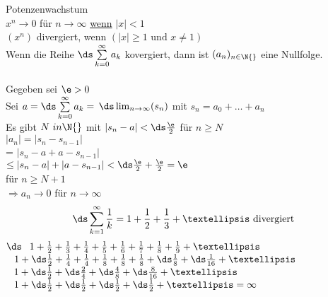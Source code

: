 Potenzenwachstum\\
$x^n \to 0$ für $ n \to \infty$ \underline{wenn} $|x| < 1$\\
$(x^n)$ divergiert, wenn $(|x| \geq 1 \text{ und } x \neq 1)$\\
%
Wenn die Reihe $\ds\sum\limits_{k=0}^{\infty} a_k $ kovergiert, dann ist $(a_n)_{n \in \N{}}$ eine Nullfolge.\\
\\
\bew Gegeben sei $\e > 0$\\
Sei $a = \ds\sum\limits_{k = 0}^{\infty} a_k = $ $\ds\lim_{n \to \infty}(s_n)$ mit $s_n = a_0 + … + a_n$\\
Es gibt $ N \ in \N{}$ mit $|s_n - a| < \ds\frac{\e}{2}$ für $n \geq N$\\
$|a_n| = |s_n - s_{n-1}|$\\
\phantom{$|a_n| $} = $|s_n - a + a - s_{n-1}|$\\
\phantom{$|a_n| $} $\leq |s_n - a| + |a - s_{n-1}| < \ds\frac{\e}{2} + \frac{\e}{2} = \e$\\
für $n \geq N + 1$\\
$\Rightarrow a_n \to 0$ für $n \to \infty$\\
%
$$\ds\sum\limits_{k = 1}^{\infty} \frac{1}{k}= 1 + \frac{1}{2} + \frac{1}{3} + …\text{ divergiert}$$
$\ds\phantom{= }1 + \frac{1}{2} + \frac{1}{3} +\frac{1}{4} +\frac{1}{5} +\frac{1}{6} +\frac{1}{7} + \frac{1}{8} +\frac{1}{9} +…$\\
$\phantom{\geq }1 + \ds\frac{1}{2} +\frac{1}{4}+\frac{1}{4}+\frac{1}{8}+\frac{1}{8} + \frac{1}{8} + \ds\frac{1}{8} + \ds\frac{1}{16} + …$\\
$\phantom{= }1 + \ds\frac{1}{2} + \ds\frac{2}{4} + \ds\frac{4}{8} + \ds\frac{8}{16} + …$\\
$\phantom{= }1 + \ds\frac{1}{2} + \ds\frac{1}{2} + \ds\frac{1}{2} + \ds\frac{1}{2} + … = \infty$